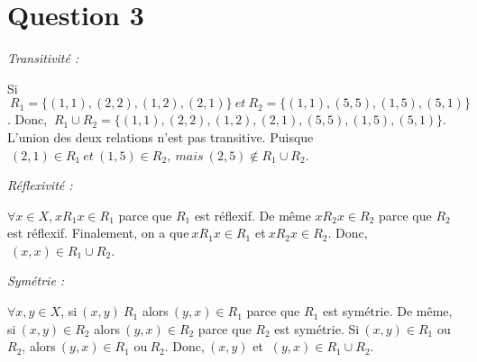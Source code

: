 \section*{Question 3}
\noindent
\emph{Transitivité :}

Si$\ R_1 = \{(1,1), (2,2), (1,2), (2,1)\}\ et\ R_2 = \{(1,1), (5,5), (1,5), (5,1)\}$. Donc, $\ R_1 \cup R_2 = \{(1,1), (2,2), (1,2), (2,1), (5,5), (1,5), (5,1)\}$. L'union des  deux relations n'est pas transitive. Puisque$\ (2,1) \in R_1\ et\ (1,5) \in R_2,\ mais\ (2,5) \notin R_1 \cup R_2$.

\bigskip

\emph{Réflexivité :}

$\forall x\in X$,$\ xR_1x \in R_1$ parce que $R_1$ est réflexif. De même $xR_2x \in R_2$ parce que $R_2$ est réflexif. Finalement, on a que$\ xR_1x \in R_1$ et$\ xR_2x \in R_2$. Donc,$\ (x,x) \in R_1\cup R_2$.

\bigskip

\emph{Symétrie : }

$\forall x,y \in X$, si$\ (x,y)\ R_1$ alors$\ (y,x) \in R_1$ parce que $R_1$ est symétrie. De même, si$\ (x,y) \in R_2$ alors$\ (y,x) \in R_2$ parce que $R_2$ est symétrie. Si$\ (x, y) \in R_1$ ou $R_2$, alors$\ (y,x) \in R_1$ ou$\ R_2$. Donc,$\ (x, y)$ et
$\ (y,x) \in R_1 \cup R_2$.